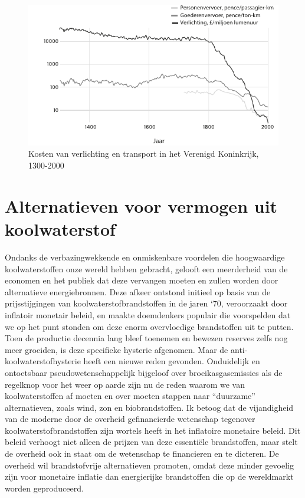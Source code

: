 \begin{figure}[!htb]
\centering
    \includegraphics[width=\textwidth]{figures/fig16.pdf}
    \caption[Kosten van verlichting en transport in het Verenigd Koninkrijk, 1300-2000]{Kosten van verlichting en transport in het Verenigd Koninkrijk, 1300-2000}
    \label{fig16}
\end{figure}

\clearpage
\hypertarget{alternatieven-voor-vermogen-uit-koolwaterstof}{%
\section{Alternatieven voor vermogen uit koolwaterstof}\label{alternatieven-voor-vermogen-uit-koolwaterstof}}

Ondanks de verbazingwekkende en onmiskenbare voordelen die hoogwaardige koolwaterstoffen onze wereld hebben gebracht, gelooft een meerderheid van de economen en het publiek dat deze vervangen moeten en zullen worden door alternatieve energiebronnen. Deze afkeer ontstond initieel op basis van de prijsstijgingen van koolwaterstofbrandstoffen in de jaren `70, veroorzaakt door inflatoir monetair beleid, en maakte doemdenkers populair die voorspelden dat we op het punt stonden om deze enorm overvloedige brandstoffen uit te putten. Toen de productie decennia lang bleef toenemen en bewezen reserves zelfs nog meer groeiden, is deze specifieke hysterie afgenomen. Maar de anti-koolwaterstofhysterie heeft een nieuwe reden gevonden. Onduidelijk en ontoetsbaar pseudowetenschappelijk bijgeloof over broeikasgasemissies als de regelknop voor het weer op aarde zijn nu de reden waarom we van koolwaterstoffen af moeten en over moeten stappen naar ``duurzame''  alternatieven, zoals wind, zon en biobrandstoffen. Ik betoog dat de vijandigheid van de moderne door de overheid gefinancierde wetenschap tegenover koolwaterstofbrandstoffen zijn wortels heeft in het inflatoire monetaire beleid. Dit beleid verhoogt niet alleen de prijzen van deze essentiële brandstoffen, maar stelt de overheid ook in staat om de wetenschap te financieren en te dicteren. De overheid wil brandstofvrije alternatieven promoten, omdat deze minder gevoelig zijn voor monetaire inflatie dan energierijke brandstoffen die op de wereldmarkt worden geproduceerd.

